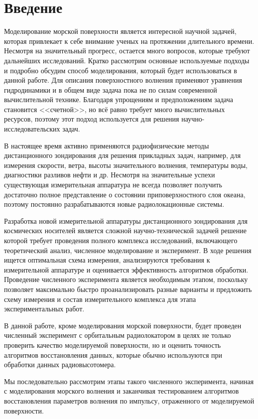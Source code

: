 
\section{Введение}%
\label{sec:vvedenie}

Моделирование морской поверхности является интересной научной задачей, которая
привлекает к себе внимание ученых на протяжении длительного времени.
Несмотря на значительный прогресс, остается много вопросов, которые требуют
дальнейших исследований. Кратко рассмотрим основные используемые подходы и
подробно обсудим способ моделирования, который будет использоваться в данной
работе.  Для описания поверхностного волнения применяют уравнения гидродинамики
и в общем виде задача пока не по силам современной вычислительной технике.
Благодаря упрощениям и предположениям задача становится <<счетной>>, но всё
равно требует много вычислительных ресурсов, поэтому этот подход используется для
решения научно-исследовательских задач. 

В настоящее время активно применяются радиофизические методы дистанционного
зондирования для
решения прикладных задач, например, для измерения скорости, ветра, высоты
значительного волнения, температуры воды, диагностики разливов нефти и др. 
Несмотря  на значительные успехи существующая измерительная аппаратура не
всегда позволяет получить достаточно полное представление о состоянии
приповерхностного слоя океана, поэтому постоянно разрабатываются новые
радиолокационные системы.

Разработка новой измерительной аппаратуры дистанционного зондирования для
космических носителей является сложной научно-технической задачей решение
которой требует проведения полного комплекса исследований, включающего
теоретический анализ, численное моделирование и эксперимент. В ходе решения
ищется оптимальная схема измерения, анализируются требования к измерительной
аппаратуре и оценивается эффективность алгоритмов обработки. Проведение
численного эксперимента является необходимым этапом, поскольку  позволяет максимально быстро проанализировать разные варианты и предложить схему измерения и состав измерительного комплекса для этапа экспериментальных работ.

В данной работе, кроме моделирования морской поверхности, будет проведен 
численный эксперимент с орбитальным радиолокатором в целях не только проверить
качество моделируемой поверхности, но и оценить точность алгоритмов
восстановления данных, которые обычно используются при обработки данных
радиовысотомера.  

Мы последовательно рассмотрим этапы такого численного эксперимента, начиная  с
моделирования морского волнения и заканчивая тестированием алгоритмов
восстановления параметров волнения по импульсу, отраженного от моделируемой поверхности.

